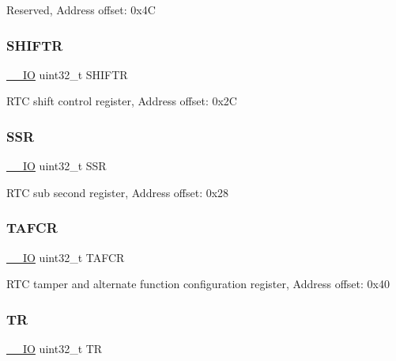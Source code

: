 Reserved, Address offset\+: 0x4C \mbox{\label{struct_r_t_c___type_def_a2372c05a6c5508e0a9adada793f68b4f}} 
\subsubsection{\texorpdfstring{S\+H\+I\+F\+TR}{SHIFTR}}
{\footnotesize\ttfamily \hyperlink{core__sc300_8h_aec43007d9998a0a0e01faede4133d6be}{\+\_\+\+\_\+\+IO} uint32\+\_\+t S\+H\+I\+F\+TR}

R\+TC shift control register, Address offset\+: 0x2C \mbox{\label{struct_r_t_c___type_def_a8a868e5e76b52ced04c536be3dee08ec}} 
\subsubsection{\texorpdfstring{S\+SR}{SSR}}
{\footnotesize\ttfamily \hyperlink{core__sc300_8h_aec43007d9998a0a0e01faede4133d6be}{\+\_\+\+\_\+\+IO} uint32\+\_\+t S\+SR}

R\+TC sub second register, Address offset\+: 0x28 \mbox{\label{struct_r_t_c___type_def_a14d03244a7fda1d94b51ae9ed144ca12}} 
\subsubsection{\texorpdfstring{T\+A\+F\+CR}{TAFCR}}
{\footnotesize\ttfamily \hyperlink{core__sc300_8h_aec43007d9998a0a0e01faede4133d6be}{\+\_\+\+\_\+\+IO} uint32\+\_\+t T\+A\+F\+CR}

R\+TC tamper and alternate function configuration register, Address offset\+: 0x40 \mbox{\label{struct_r_t_c___type_def_a63d179b7a36a715dce7203858d3be132}} 
\subsubsection{\texorpdfstring{TR}{TR}}
{\footnotesize\ttfamily \hyperlink{core__sc300_8h_aec43007d9998a0a0e01faede4133d6be}{\+\_\+\+\_\+\+IO} uint32\+\_\+t TR}

